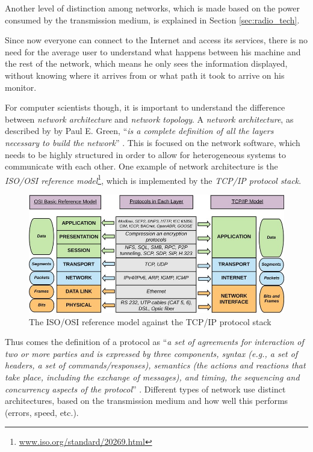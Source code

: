 		Another level of distinction among networks, which is made based on the power consumed by the transmission medium, is explained in Section \ref{sec:radio_tech}.
		
		Since now everyone can connect to the Internet and access its services, there is no need for the average user to understand what happens between his machine and the rest of the network, which means he only sees the information displayed, without knowing where it arrives from or what path it took to arrive on his monitor.
		
		For computer scientists though, it is important to understand the difference between \textit{network architecture} and \textit{network topology}.	
		A \textit{network architecture}, as described by by Paul E. Green, ``\textit{is a complete definition of all the layers necessary to build the network}'' \cite{nla.cat-vn252493}.
		This is focused on the network software, which needs to be highly structured in order to allow for heterogeneous systems to communicate with each other.
		One example of network architecture is the \textit{ISO/OSI reference model}\footnote{ \url{www.iso.org/standard/20269.html}}, which is implemented by the \textit{TCP/IP protocol stack}.
		
		\begin{figure}[h]
			\centering
			\includegraphics[width=\textwidth]{resources/img/chap3/isoosi}
			\caption{The ISO/OSI reference model against the TCP/IP protocol stack}
		\end{figure}
		
		Thus comes the definition of a protocol as ``\textit{a set of agreements for interaction of two or more parties and is expressed by three components, syntax (e.g., a set of headers, a set of commands/responses), semantics (the actions and reactions that take place, including the exchange of messages), and timing, the sequencing and concurrency aspects of the protocol}'' \cite{nla.cat-vn252493}.
		Different types of network use distinct architectures, based on the transmission medium and how well this performs (errors, speed, etc.).
		
